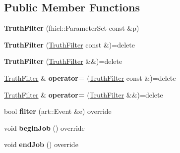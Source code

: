 \subsection*{Public Member Functions}
\begin{DoxyCompactItemize}
\item 
{\bfseries Truth\+Filter} (fhicl\+::\+Parameter\+Set const \&p)\hypertarget{classTruthFilter_ac78d452c321386fa30dd021a1498e6d7}{}\label{classTruthFilter_ac78d452c321386fa30dd021a1498e6d7}

\item 
{\bfseries Truth\+Filter} (\hyperlink{classTruthFilter}{Truth\+Filter} const \&)=delete\hypertarget{classTruthFilter_a3bb3577f75d6de9e0bd2cbaf9b51fb3a}{}\label{classTruthFilter_a3bb3577f75d6de9e0bd2cbaf9b51fb3a}

\item 
{\bfseries Truth\+Filter} (\hyperlink{classTruthFilter}{Truth\+Filter} \&\&)=delete\hypertarget{classTruthFilter_a634dcfa981c7b34b202a825c7f550ea2}{}\label{classTruthFilter_a634dcfa981c7b34b202a825c7f550ea2}

\item 
\hyperlink{classTruthFilter}{Truth\+Filter} \& {\bfseries operator=} (\hyperlink{classTruthFilter}{Truth\+Filter} const \&)=delete\hypertarget{classTruthFilter_adf7a3c444198d4b2ea0450a29a6ebe8a}{}\label{classTruthFilter_adf7a3c444198d4b2ea0450a29a6ebe8a}

\item 
\hyperlink{classTruthFilter}{Truth\+Filter} \& {\bfseries operator=} (\hyperlink{classTruthFilter}{Truth\+Filter} \&\&)=delete\hypertarget{classTruthFilter_a890d5add6632b2be43406dd075ac707e}{}\label{classTruthFilter_a890d5add6632b2be43406dd075ac707e}

\item 
bool {\bfseries filter} (art\+::\+Event \&e) override\hypertarget{classTruthFilter_a2e4f8564b410b41b253527bec0879a72}{}\label{classTruthFilter_a2e4f8564b410b41b253527bec0879a72}

\item 
void {\bfseries begin\+Job} () override\hypertarget{classTruthFilter_a1ef8e6334b66ae5433e92f4b18a528a1}{}\label{classTruthFilter_a1ef8e6334b66ae5433e92f4b18a528a1}

\item 
void {\bfseries end\+Job} () override\hypertarget{classTruthFilter_a2f817fb39d4f66f406557ba0aa50727c}{}\label{classTruthFilter_a2f817fb39d4f66f406557ba0aa50727c}

\end{DoxyCompactItemize}

